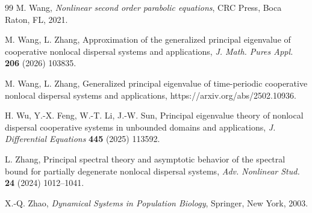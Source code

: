 \documentclass[11pt,reqno]{amsart}
\numberwithin{equation}{section}
\begin{document}
\begin{thebibliography}{99}
M. Wang, {\it Nonlinear second order parabolic equations}, CRC Press, Boca Raton, FL, 2021.


M. Wang, L. Zhang, Approximation of the generalized principal eigenvalue of cooperative nonlocal dispersal systems and applications, \emph{J. Math. Pures Appl.} {\bf 206} (2026) 103835.

M. Wang, L. Zhang, Generalized principal eigenvalue of time-periodic cooperative nonlocal dispersal systems and applications, https://arxiv.org/abs/2502.10936.


 H. Wu, Y.-X. Feng, W.-T. Li, J.-W. Sun, Principal eigenvalue theory of nonlocal
dispersal cooperative systems in unbounded domains and applications, \emph{J. Differential Equations} {\bf 445} (2025) 113592.


L. Zhang, Principal spectral theory and asymptotic behavior of the spectral bound for partially degenerate nonlocal dispersal systems, \emph{Adv. Nonlinear Stud.} {\bf 24} (2024) 1012--1041.

X.-Q. Zhao, \emph{Dynamical Systems in Population Biology},  Springer, New York, 2003.



\end{thebibliography}
\end{document}
